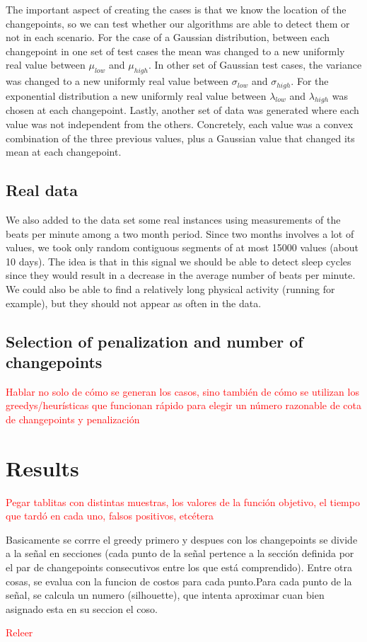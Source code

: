 \documentclass[pdflatex,sn-mathphys]{sn-jnl}%
\theoremstyle{thmstyleone}%
\theoremstyle{thmstyletwo}%
\theoremstyle{thmstylethree}%
\begin{document}
The important aspect of creating the cases is that we know the location of the changepoints, so we can test whether our algorithms are able to detect them or not in each scenario. For the case of a Gaussian distribution, between each changepoint in one set of test cases the mean was changed to a new uniformly real value between $\mu_{low}$ and $\mu_{high}$. In other set of Gaussian test cases, the variance was changed to a new uniformly real value between $\sigma_{low}$ and $\sigma_{high}$. For the exponential distribution a new uniformly real value between $\lambda_{low}$ and $\lambda_{high}$ was chosen at each changepoint. Lastly, another set of data was generated where each value was not independent from the others. Concretely, each value was a convex combination of the three previous values, plus a Gaussian value that changed its mean at each changepoint.

\subsection{Real data}

We also added to the data set some real instances using measurements of the beats per minute among a two month period. Since two months involves a lot of values, we took only random contiguous segments of at most 15000 values (about 10 days). The idea is that in this signal we should be able to detect sleep cycles since they would result in a decrease in the average number of beats per minute. We could also be able to find a relatively long physical activity (running for example), but they should not appear as often in the data.

\subsection{Selection of penalization and number of changepoints}

\textcolor{red}{Hablar no solo de c\'omo se generan los casos, sino tambi\'en de cómo se utilizan los greedys/heur\'isticas que funcionan r\'apido para elegir un número razonable de cota de changepoints y penalizaci\'on}

\section{Results}\label{results}

\textcolor{red}{Pegar tablitas con distintas muestras, los valores de la funci\'on objetivo, el tiempo que tard\'o en cada uno, falsos positivos, etc\'etera}

Basicamente se corrre el greedy primero y despues con los changepoints se divide a la señal en secciones (cada punto de la señal pertence a la sección definida por el par de changepoints consecutivos entre los que está comprendido). Entre otra cosas, se evalua con la funcion de costos para cada punto.Para cada punto de la señal, se calcula un numero (silhouette), que intenta aproximar cuan bien asignado esta en su seccion el coso. 





\textcolor{red}{Releer}



\end{document}
